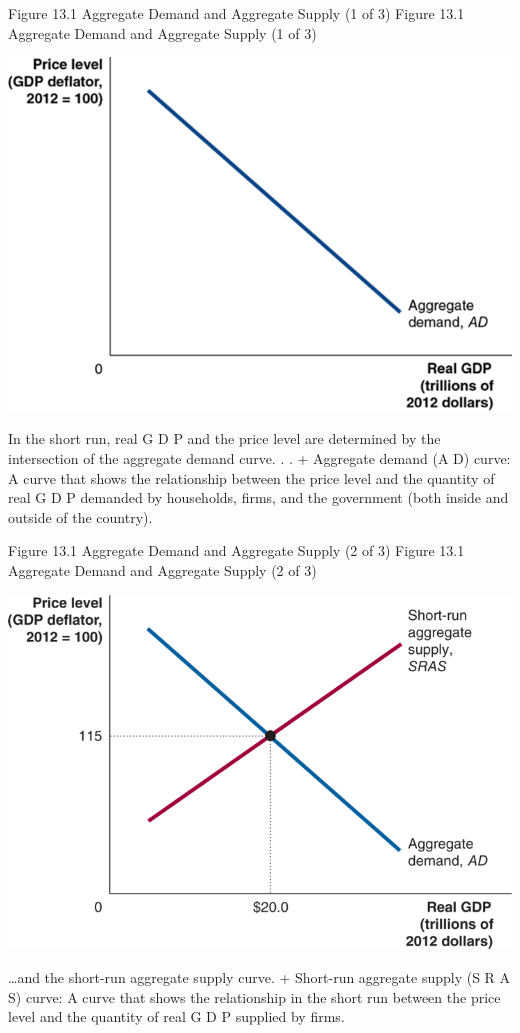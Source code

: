 \documentclass[
  12pt,
  ignorenonframetext,
]{beamer}
\begin{document}
\begin{frame}{Figure 13.1 Aggregate Demand and Aggregate Supply (1 of
3)}
\protect\hypertarget{figure-13.1-aggregate-demand-and-aggregate-supply-1-of-3}{}
Figure 13.1 Aggregate Demand and Aggregate Supply (1 of 3)

\includegraphics[width=\textwidth,height=0.99\textheight]{imgs3/img_slide06a.png}

In the short run, real G D P and the price level are determined by the
intersection of the aggregate demand curve. . . + Aggregate demand (A D)
curve: A curve that shows the relationship between the price level and
the quantity of real G D P demanded by households, firms, and the
government (both inside and outside of the country).
\end{frame}

\begin{frame}{Figure 13.1 Aggregate Demand and Aggregate Supply (2 of
3)}
\protect\hypertarget{figure-13.1-aggregate-demand-and-aggregate-supply-2-of-3}{}
Figure 13.1 Aggregate Demand and Aggregate Supply (2 of 3)

\includegraphics[width=\textwidth,height=0.99\textheight]{imgs3/img_slide07a.png}

\ldots and the short-run aggregate supply curve. + Short-run aggregate
supply (S R A S) curve: A curve that shows the relationship in the short
run between the price level and the quantity of real G D P supplied by
firms.
\end{frame}
\end{document}
